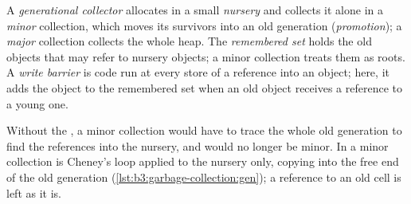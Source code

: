 \begin{definition}\label{def:b3:garbage-collection:generational}
A \emph{generational collector} allocates in a small \emph{nursery} and collects it alone in a \emph{minor} collection, which moves its survivors into an old generation (\emph{promotion}); a \emph{major} collection collects the whole heap. The \emph{remembered set} holds the old objects that may refer to nursery objects; a minor collection treats them as roots. A \emph{write barrier} is code run at every store of a reference into an object; here, it adds the object to the remembered set when an old object receives a reference to a young one.
\end{definition}

Without the , a minor collection would have to trace the whole old generation to find the references into the nursery, and would no longer be minor. In  a minor collection is Cheney's loop applied to the nursery only, copying into the free end of the old generation (\cref{lst:b3:garbage-collection:gen}); a reference to an old cell is left as it is.

\label{lst:b3:garbage-collection:gen}

